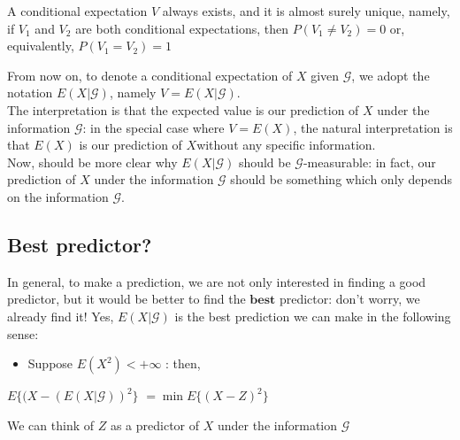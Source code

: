\begin{theorem}[Theorem]
A conditional expectation $V$ always exists, and it is almost surely unique, namely, if $V_1$ and $V_2$ are both conditional expectations, then $P(V_1 \neq V_2)=0$ or, equivalently, $P(V_1 = V_2) = 1$
\end{theorem}
From now on, to denote a conditional expectation of $X$ given $\mathcal{G}$, we adopt the notation $E(X|\mathcal{G})$, namely $V=E(X|\mathcal{G})$.\\
The interpretation is that the expected value is our prediction of $X$ under the information $\mathcal{G}$: in the special case where $V=E(X)$, the natural interpretation is that $E(X)$ is our prediction of $X$without any specific information. \\
Now, should be more clear why $E(X|\mathcal{G})$ should be $\mathcal{G}$-measurable: in fact, our prediction of $X$ under the information $\mathcal{G}$ should be something which only depends on the information $\mathcal{G}$.

\subsection{Best predictor?}
In general, to make a prediction, we are not only interested in finding a good predictor, but it would be better to find the $\mathbf{best}$ predictor: don't worry, we already find it!
Yes, $E(X|\mathcal{G})$ is the best prediction we can make in the following sense:
\begin{itemize}
    \item Suppose $E(X^2) < +\infty$ : then, 
\end{itemize}
\begin{center}
    $E\{(X-(E(X|\mathcal{G}))^2\}$ $= \min E\{(X-Z)^2\}$ 
\end{center}
We can think of $Z$ as a predictor of $X$ under the information $\mathcal{G}$ 

